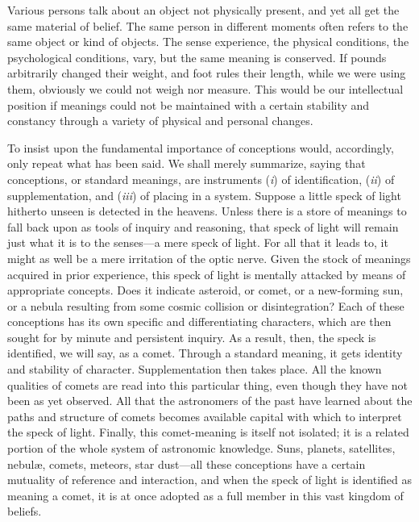 \documentclass[letterpaper]{book}
\begin{document}

Various persons talk about an object not physically present, and yet all
get the same material of belief. The same person in different moments
often refers to the same object or kind of objects. The sense
experience, the physical conditions, the psychological conditions, vary,
but the same meaning is conserved. If
pounds
arbitrarily changed their weight, and foot rules their length, while we
were using them, obviously we could not weigh nor measure. This would be
our intellectual position if meanings could not be maintained with a
certain stability and constancy through a variety of physical and
personal changes.




To insist upon the fundamental importance of conceptions would,
accordingly, only repeat what has been said. We shall merely summarize,
saying that conceptions, or standard meanings, are instruments
(\emph{i}) of identification, (\emph{ii}) of supplementation, and
(\emph{iii}) of placing in a system. Suppose a little speck of light
hitherto unseen is detected in the heavens. Unless there is a store of
meanings to fall back upon as tools of inquiry and reasoning, that speck
of light will remain just what it is to the senses---a mere speck of
light. For all that it leads to, it might as well be a mere irritation
of the optic nerve. Given the stock of meanings acquired in prior
experience, this speck of light is mentally attacked by means of
appropriate concepts. Does it indicate asteroid, or comet, or a
new-forming sun, or a nebula resulting from some cosmic collision or
disintegration? Each of these conceptions has its own specific and
differentiating characters, which are then sought for by minute and
persistent inquiry. As a result, then, the speck is identified, we will
say, as a comet. Through a standard meaning, it gets identity and
stability of character. Supplementation then takes place. All the known
qualities of comets are read into this particular thing, even though
they have not been as yet observed. All that the astronomers of the past
have learned about the paths and structure of comets becomes available
capital with which to interpret the
speck
of light. Finally, this comet-meaning is itself not isolated; it is a
related portion of the whole system of astronomic knowledge. Suns,
planets, satellites, nebulæ, comets, meteors, star dust---all these
conceptions have a certain mutuality of reference and interaction, and
when the speck of light is identified as meaning a comet, it is at once
adopted as a full member in this vast kingdom of beliefs.
\end{document}
